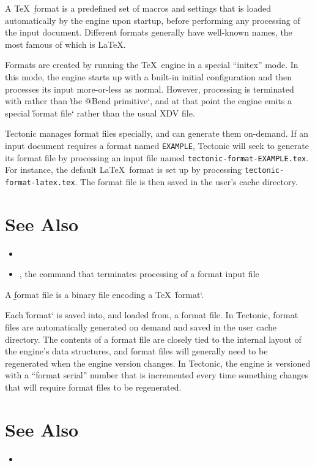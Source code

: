 
A \TeX\ \b{format} is a predefined set of macros and settings that is loaded
automatically by the engine upon startup, before performing any processing of
the input document. Different formats generally have well-known names, the most
famous of which is \LaTeX.

Formats are created by running the \TeX\ engine in a special “initex” mode. In
this mode, the engine starts up with a built-in initial configuration and then
processes its input more-or-less as normal. However, processing is terminated
with  rather than \`the @Bend primitive`, and at that point the engine
emits a special \`format file` rather than the usual XDV file.

Tectonic manages format files specially, and can generate them on-demand. If an
input document requires a format named \texttt{EXAMPLE}, Tectonic will seek to
generate its format file by processing an input file named
\texttt{tectonic-format-EXAMPLE.tex}. For instance, the default \LaTeX\ format
is set up by processing \texttt{tectonic-format-latex.tex}. The format file is
then saved in the user's cache directory.

\section*{See Also}

\begin{itemize}
\item {}
\item {}, the command that terminates processing of a format input file
\end{itemize}



A \b{format file} is a binary file encoding a \TeX\ \`format`.

Each \`format` is saved into, and loaded from, a format file. In Tectonic,
format files are automatically generated on demand and saved in the user cache
directory. The contents of a format file are closely tied to the internal layout
of the engine's data structures, and format files will generally need to be
regenerated when the engine version changes. In Tectonic, the engine is
versioned with a “format serial” number that is incremented every time something
changes that will require format files to be regenerated.

\section*{See Also}

\begin{itemize}
\item {}
\end{itemize}
